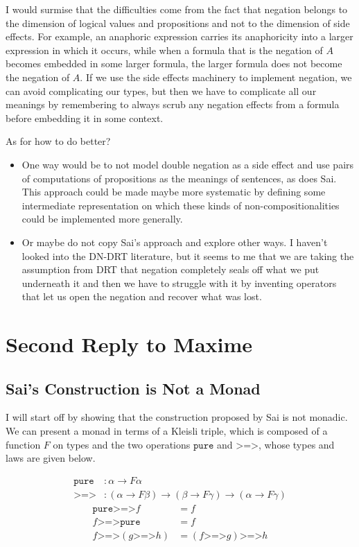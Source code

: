 \documentclass[a4paper,11pt,DIV=12]{scrartcl}
\newcommand{\hscomp}{\mathbin{\texttt{>=>}}}
\begin{document}
I would surmise that the difficulties come from the fact that negation
belongs to the dimension of logical values and propositions and not to the
dimension of side effects. For example, an anaphoric expression carries its
anaphoricity into a larger expression in which it occurs, while when a
formula that is the negation of $A$ becomes embedded in some larger
formula, the larger formula does not become the negation of $A$. If we use
the side effects machinery to implement negation, we can avoid complicating
our types, but then we have to complicate all our meanings by remembering
to always scrub any negation effects from a formula before embedding it in
some context.

As for how to do better?

\begin{itemize}
\item One way would be to not model double negation as a side effect and
  use pairs of computations of propositions as the meanings of sentences,
  as does Sai. This approach could be made maybe more systematic by
  defining some intermediate representation on which these kinds of
  non-compositionalities could be implemented more generally.
\item Or maybe do not copy Sai's approach and explore other ways. I haven't
  looked into the DN-DRT literature, but it seems to me that we are taking
  the assumption from DRT that negation completely seals off what we put
  underneath it and then we have to struggle with it by inventing operators
  that let us open the negation and recover what was lost.
\end{itemize}

\section{Second Reply to Maxime}

\subsection{Sai's Construction is Not a Monad}

I will start off by showing that the construction proposed by Sai is not
monadic. We can present a monad in terms of a Kleisli triple, which is
composed of a function $F$ on types and the two operations $\texttt{pure}$
and $\hscomp$, whose types and laws are given below.

\begin{align*}
  \texttt{pure} &: \alpha \to F \alpha \\
  \hscomp &: (\alpha \to F \beta) \to (\beta \to F \gamma) \to (\alpha \to F \gamma)
\end{align*}
\begin{align*}
  \texttt{pure} \hscomp f &= f \\
  f \hscomp \texttt{pure} &= f \\
  f \hscomp (g \hscomp h) &= (f \hscomp g) \hscomp h
\end{align*}
\end{document}
